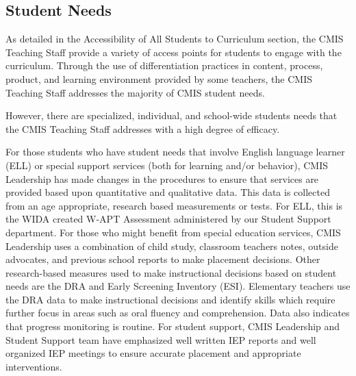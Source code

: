 \documentclass{report}
\begin{document}
\subsection{Student Needs}



\begin{findings}
As detailed in the Accessibility of All Students to Curriculum section, the CMIS Teaching Staff provide a variety of access points for students to engage with the curriculum. Through the use of differentiation practices in content, process, product, and learning environment provided by some teachers, the CMIS Teaching Staff addresses the majority of CMIS student needs. 


However, there are specialized, individual, and school-wide students needs that the CMIS Teaching Staff addresses with a high degree of efficacy. 


For those students who have student needs that involve English language learner (ELL) or special support services (both for learning and/or behavior), CMIS Leadership has made changes in the procedures to ensure that services are provided based upon quantitative and qualitative data. This data is collected from an age appropriate, research based measurements or  tests.  For ELL, this is the WIDA created W-APT Assessment administered by our Student Support department. For those who might benefit from special education services, CMIS Leadership uses a combination of child study, classroom teachers notes, outside advocates, and previous school reports to make placement decisions. Other research-based measures used to make instructional decisions based on student needs are the DRA and  Early Screening Inventory (ESI). Elementary teachers use the DRA data to make instructional decisions and identify skills which require further focus in areas such as oral fluency and comprehension. Data also indicates that progress monitoring is routine. For student support, CMIS Leadership and Student Support team have emphasized well written IEP reports and well organized IEP meetings to ensure accurate placement and appropriate interventions. 


\end{findings}
\end{document}
